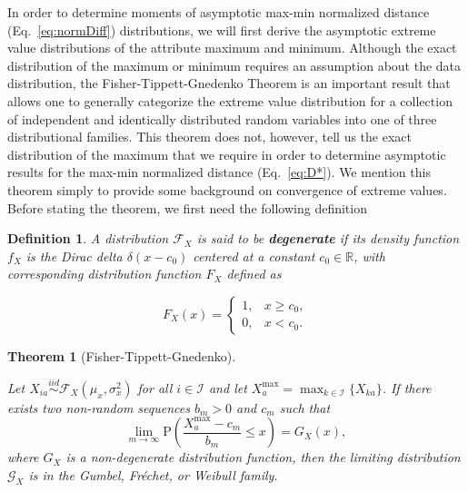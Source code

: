 \documentclass[aos]{imsart}
\newtheorem{theorem}{Theorem}[section]
\newtheorem{definition}{Definition}[section]
\begin{document}
In order to determine moments of asymptotic max-min normalized distance (Eq.~\ref{eq:normDiff}) distributions, we will first derive the asymptotic extreme value distributions of the attribute maximum and minimum. Although the exact distribution of the maximum or minimum requires an assumption about the data distribution, the Fisher-Tippett-Gnedenko Theorem is an important result that allows one to generally categorize the extreme value distribution for a collection of independent and identically distributed random variables into one of three distributional families. This theorem does not, however, tell us the exact distribution of the maximum that we require in order to determine asymptotic results for the max-min normalized distance (Eq.~\ref{eq:D*}). We mention this theorem simply to provide some background on convergence of extreme values. Before stating the theorem, we first need the following definition
%
\begin{definition}
	A distribution $\mathcal{F}_X$ is said to be \textbf{degenerate} if its density function $f_X$ is the Dirac delta $\delta(x - c_0)$ centered at a constant $c_0 \in \mathbb{R}$, with corresponding distribution function $F_X$ defined as
	
	\[F_X(x)=\begin{cases}
	1, & x \geq c_0, \\
	0, & x < c_0.
	\end{cases}
	\]
\end{definition}
%
\begin{theorem}[Fisher-Tippett-Gnedenko]\label{thm:EVT}
	
	Let $X_{ia} \overset{iid}{\sim} \mathcal{F}_X\left(\mu_x,\sigma^2_x\right)$ for all $i \in \mathcal{I}$ and let $X^\text{max}_a = \displaystyle \max_{k \in \mathcal{I}}\{X_{ka}\}$. If there exists two non-random sequences $b_m>0$ and $c_m$ such that
	\[\lim_{m \to \infty} \text{P}\left(\frac{X^\text{max}_a - c_m}{b_m} \leq x\right) = G_X(x),\]
	\noindent where $G_X$ is a non-degenerate distribution function, then the limiting distribution $\mathcal{G}_X$ is in the Gumbel, Fr\'{e}chet, or Weibull family.
\end{theorem}
\end{document}
